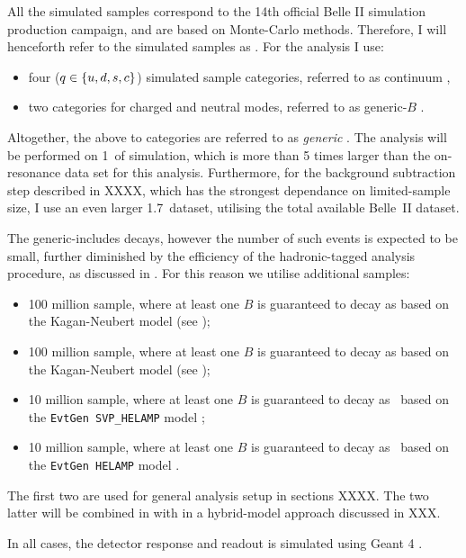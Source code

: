 All the simulated samples correspond to the 14th official Belle II simulation production campaign, and are based on Monte-Carlo methods.
Therefore, I will henceforth refer to the simulated samples as \MC.
For the analysis I use:
\begin{itemize}
    \item four \epem\ra\qqbar ($q\in\{u,d,s,c\}$) simulated sample categories, referred to as continuum \MC,
    \item two \FourS\ra\BB categories for charged and neutral \B modes, referred to as generic-$B$ \MC.
\end{itemize}
Altogether, the above to categories are referred to as \textit{generic} \MC.
The analysis will be performed on 1~\invab of simulation, which is more than 5 times larger than the on-resonance data set for this analysis.
Furthermore, for the background subtraction step described in XXXX, which has the strongest dependance on limited-\MC sample size, I use an even larger 1.7~\invab dataset, utilising the total available Belle~II \MC dataset.

The generic-\B \MC includes \BtoXsgamma decays, however the number of such events is expected to be small, further diminished by the efficiency of the hadronic-tagged analysis procedure, as discussed in .
For this reason we utilise additional samples:
\begin{itemize}
    \item 100 million \BpBm sample, where at least one $B$ is guaranteed to decay as \BptoXsgamma based on the Kagan-Neubert model \cite{Kagan:1998ym} (see );
    \item 100 million \BzBzb sample, where at least one $B$ is guaranteed to decay as \BztoXsgamma based on the Kagan-Neubert model \cite{Kagan:1998ym} (see );
    \item 10 million \BpBm sample, where at least one $B$ is guaranteed to decay as \Bpm\ra\Kstarpm\gamma~based on the \texttt{EvtGen SVP\_HELAMP} model \cite{Ryd:2005zz};
    \item 10 million \BzBzb sample, where at least one $B$ is guaranteed to decay as \Bz\ra\Kstarz\gamma~based on the \texttt{EvtGen HELAMP} model \cite{Ryd:2005zz}.
\end{itemize}
The first two are used for general analysis setup in sections XXXX.
The two latter will be combined in with \BtoXsgamma in a hybrid-model approach \cite{Ramirez:1989yk} discussed in XXX.

In all cases, the detector response and readout is simulated using Geant 4 \cite{GEANT4:2002zbu}.
